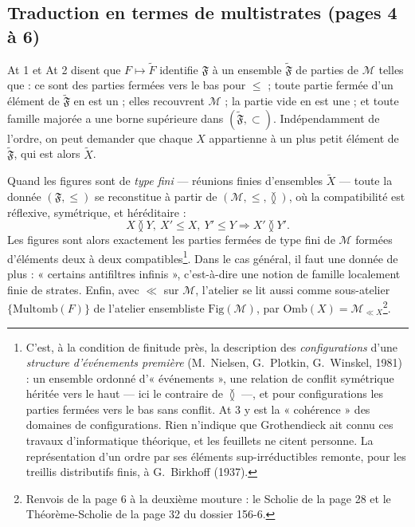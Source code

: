 \documentclass[11pt,a4paper]{article}
\begin{document}
\subsection*{Traduction en termes de multistrates (pages 4 à 6)}

At 1 et At 2 disent que $F \mapsto \widetilde{F}$ identifie $\mathfrak{F}$ à un
ensemble $\widetilde{\mathfrak{F}}$ de parties de $\mathcal{M}$ telles que : ce
sont des parties fermées vers le bas pour $\leq$ ; toute partie fermée d'un
élément de $\widetilde{\mathfrak{F}}$ en est un ; elles recouvrent $\mathcal{M}$ ;
la partie vide en est une ; et toute famille majorée a une borne supérieure dans
$(\widetilde{\mathfrak{F}}, \subset)$. Indépendamment de l'ordre, on peut demander
que chaque $X$ appartienne à un plus petit élément de
$\widetilde{\mathfrak{F}}$, qui est alors $\widetilde{X}$.

Quand les figures sont de \emph{type fini} --- réunions finies d'ensembles
$\widetilde{X}$ --- toute la donnée $(\mathfrak{F}, \leq)$ se reconstitue à partir
de $(\mathcal{M}, \leq, \between)$, où la compatibilité est réflexive, symétrique,
et héréditaire :
\[
X \between Y,\ X' \leq X,\ Y' \leq Y \Longrightarrow X' \between Y' .
\]
Les figures sont alors exactement les parties fermées de type fini de
$\mathcal{M}$ formées d'éléments deux à deux compatibles\footnote{C'est, à la
condition de finitude près, la description des \emph{configurations} d'une
\emph{structure d'événements première} (M.~Nielsen, G.~Plotkin, G.~Winskel,
1981) : un ensemble ordonné d'« événements », une relation de conflit symétrique
héritée vers le haut --- ici le contraire de $\between$ ---, et pour
configurations les parties fermées vers le bas sans conflit. At 3 y est la
« cohérence » des domaines de configurations. Rien n'indique que Grothendieck
ait connu ces travaux d'informatique théorique, et les feuillets ne citent
personne. La représentation d'un ordre par ses éléments sup-irréductibles
remonte, pour les treillis distributifs finis, à G.~Birkhoff (1937).}. Dans le
cas général, il faut une donnée de plus : « certains antifiltres infinis »,
c'est-à-dire une notion de famille localement finie de strates. Enfin, avec $\ll$
sur $\mathcal{M}$, l'atelier se lit aussi comme sous-atelier
$\{\mathrm{Multomb}(F)\}$ de l'atelier ensembliste $\mathrm{Fig}(\mathcal{M})$,
par $\mathrm{Omb}(X) = \mathcal{M}_{\ll X}$\footnote{Renvois de la page 6 à la
deuxième mouture : le Scholie de la page 28 et le Théorème-Scholie de la page 32
du dossier 156-6.}.

\end{document}
